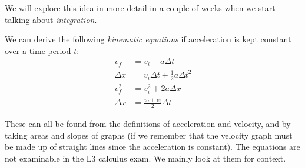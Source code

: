 We will explore this idea in more detail in a couple of weeks when we start talking about \textit{integration}.

We can derive the following \textit{kinematic equations} if acceleration is kept constant over a time period $ t $:
\begin{align*}
  v_f &= v_i + a \Delta t\\
  \Delta x &= v_i \Delta t + \frac{1}{2} a {\Delta t}^2\\
  v_f^2 &= v_i^2 + 2a \Delta x\\
  \Delta x &= \frac{v_f + v_i}{2} \Delta t
\end{align*}

These can all be found from the definitions of acceleration and velocity, and by taking areas and slopes of graphs (if
we remember that the velocity graph must be made up of straight lines since the acceleration is constant). The equations
are not examinable in the L3 calculus exam. We mainly look at them for context.

